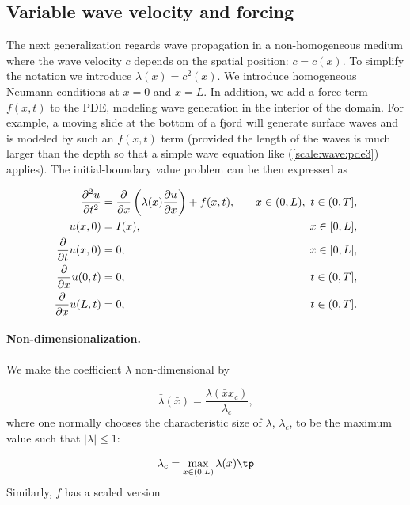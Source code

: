 \documentclass[graybox,envcountchap,sectrefs,final]{svmonodo}
\begin{document}
\subsection{Variable wave velocity and forcing}
\label{scale:wave:pde2:cvar}

The next generalization regards wave propagation in
a non-homogeneous medium where the wave velocity $c$ depends on the
spatial position: $c=c(x)$. To simplify the notation we introduce
$\lambda (x) = c^2(x)$. We introduce homogeneous Neumann conditions
at $x=0$ and $x=L$. In addition, we add a force term $f(x,t)$
to the PDE, modeling wave generation in the interior of
the domain. For example, a moving slide at the bottom of a fjord
will generate surface waves and is modeled by such an $f(x,t)$ term
(provided the length of the waves is much larger than the depth so
that a simple wave equation like (\ref{scale:wave:pde3}) applies).
The initial-boundary value problem
can be then expressed as

\begin{align}
\frac{\partial^2 u}{\partial t^2} &=
\frac{\partial}{\partial x}\left(
\lambda(x) {\partial u\over\partial x}\right) + f(x,t),
\quad & x\in (0,L),\ t\in (0,T],
\label{scale:wave:pde3}\\ 
u(x,0) &= I(x),
\quad &x\in [0,L],
\label{scale:wave:pde3:ic:u}\\ 
{\partial\over\partial t}u(x,0) &= 0,
\quad & x\in [0,L],
\label{scale:wave:pde3:ic:ut}\\ 
\frac{\partial}{\partial x}u(0,t) & = 0,
\quad  &t\in (0,T],
\label{scale:wave:pde3:bc:0}\\ 
\frac{\partial}{\partial x}u(L,t) & = 0,
\quad  &t\in (0,T].
\label{scale:wave:pde3:bc:L}
\end{align}

\paragraph{Non-dimensionalization.}
We make the coefficient $\lambda$ non-dimensional by

\begin{equation}
\bar\lambda(\bar x) = \frac{\lambda(\bar xx_c)}{\lambda_c},
\end{equation}
where one normally chooses the characteristic size of $\lambda$, $\lambda_c$,
to be the maximum value such that $|\lambda|\leq 1$:

\[ \lambda_c = \max_{x\in(0,L)}\lambda(x)\tp\]
Similarly, $f$ has a scaled version
\end{document}
